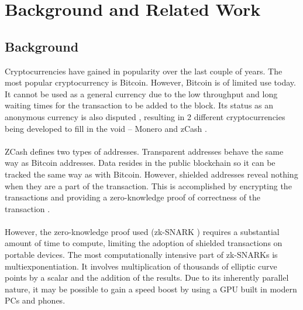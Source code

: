 
\chapter{Background and Related Work} %

\label{Chapter2} %


\section{Background}

Cryptocurrencies have gained in popularity over the last couple of years. The most popular cryptocurrency is Bitcoin. However, Bitcoin is of limited use today. It cannot be used as a general currency due to the low throughput and long waiting times for the transaction to be added to the block. Its status as an anonymous currency is also disputed \cite{biryukov2014deanonymisation, de2017analysis}, resulting in 2 different cryptocurrencies being developed to fill in the void -- Monero\cite{monero} and zCash \cite{zcashprotocol}.\\
\\
ZCash defines two types of addresses. Transparent addresses behave the same way as Bitcoin addresses. Data resides in the public blockchain so it can be tracked the same way as with Bitcoin. However, shielded addresses reveal nothing when they are a part of the transaction. This is accomplished by encrypting the transactions and providing a zero-knowledge proof of correctness of the transaction \cite{zcashtechnology}.\\
\\
However, the zero-knowledge proof used (zk-SNARK \cite{ben2014succinct, groth2016size}) requires a substantial amount of time to compute, limiting the adoption of shielded transactions on portable devices. The most computationally intensive part of zk-SNARKs is multiexponentiation. It involves multiplication of thousands of elliptic curve points by a scalar and the addition of the results. Due to its inherently parallel nature, it may be possible to gain a speed boost by using a GPU built in modern PCs and phones.




